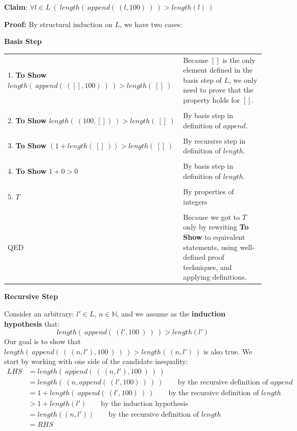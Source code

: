 \documentclass[12pt, oneside]{article}
\begin{document}
{\bf Claim}: $\forall l \in L ~ (~length(~append(~(l, 100)~)~) > length(l)~)$

{\bf Proof:} By structural induction on $L$, we have two cases:

{\bf Basis Step}

    \begin{tabular}{l p{3.5in}}
     1. \textbf{To Show} $length(~append(~([], 100)~)~) > length(~[]~)$
    & Because $[]$ is the only element defined in the basis step of $L$, 
    we only need to prove that the property holds for $[]$.\\
    &  \\
     2. \textbf{To Show} $length(~(100,[])~) > length(~[]~)$
    &  By basis step in definition of $append$.\\
    &  \\
     3. \textbf{To Show} $(1 +length(~[]~)) > length(~[]~)$
    &  By recursive step in definition of $length$.\\
    &  \\    
     4. \textbf{To Show} $1+0 > 0$
    &  By basis step in definition of $length$.\\
    &  \\    
    5. $T$
    & By properties of integers \\
    &  \\    
    QED & Because we got to $T$ only by rewriting \textbf{To Show} to equivalent statements, using well-defined proof techniques, and applying definitions. \\
    \end{tabular}

{\bf Recursive Step}

Consider an arbitrary: $l' \in L$, $n \in \mathbb{N}$, and we  assume
as the {\bf induction hypothesis} that:
\[
length(~append(~(l', 100~)~)~) > length(l')
\]
Our goal is to show that $length(~append( ~(~(n,l'), 100~)~)~) > length(~(n,l')~)$ is also true. 
We start by working with
one side of the candidate inequality:
\begin{align*}
LHS &= length(~append( ~(~ (n,l'), 100~)~)~) \\
&= length(~(n, append(~(l', 100)~)~ )~) \qquad \text{by the recursive definition of $append$}\\
&= 1 + length(~ append(~(l', 100)~) ~) \qquad \text{by the recursive definition of $length$}\\
&> 1+ length(l')  \qquad \text{by the induction hypothesis}\\
&= length( (n,l') )  \qquad \text{by the recursive definition of $length$}\\
&= RHS 
\end{align*} \vfill
\end{document}
